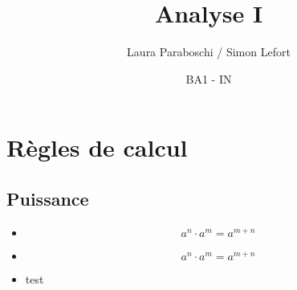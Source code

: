 \documentclass{article}
\title{Analyse I}
\author{Laura Paraboschi / Simon Lefort }
\date{BA1 - IN}
\begin{document}
\maketitle

\section{Règles de calcul}
\subsection{Puissance}
\begin{multicols}{2}

\begin{itemize}
    \item \[a^n \cdot a^m = a^{m+n}\]
    \item \[a^n \cdot a^m = a^{m+n}\]
\end{itemize}

\columnbreak

\begin{itemize}
    \item test
\end{itemize}

\end{multicols}
\end{document}
